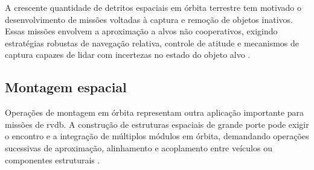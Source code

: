 A crescente quantidade de detritos espaciais em órbita terrestre tem motivado o desenvolvimento de missões voltadas à captura e remoção de objetos inativos.
Essas missões envolvem a aproximação a alvos não cooperativos, exigindo estratégias robustas de navegação relativa, controle de atitude e mecanismos de captura capazes de lidar com incertezas no estado do objeto alvo \cite{arantes2010,flores2014review}.

\subsection{Montagem espacial}

Operações de montagem em órbita representam outra aplicação importante para missões de \gls{rvdb}.
A construção de estruturas espaciais de grande porte pode exigir o encontro e a integração de múltiplos módulos em órbita, demandando operações sucessivas de aproximação, alinhamento e acoplamento entre veículos ou componentes estruturais \cite{nasaRVDBiss}.